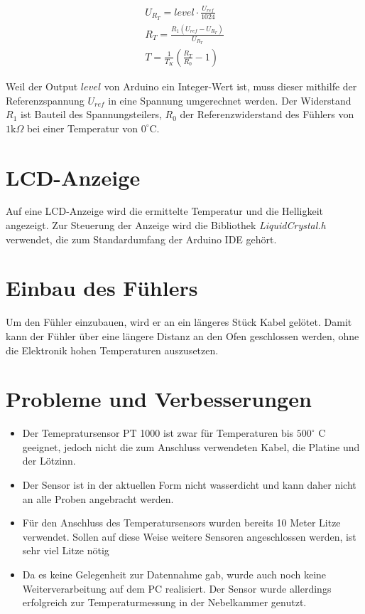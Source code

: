 \begin{gather*}
	U_{R_T} = level \cdot \frac{U_{ref}}{1024} \\
	R_T = \frac{R_1 \left(U_{ref}-U_{R_T}\right)}{U_{R_T}}\\
	T = \frac{1}{T_K} \left(\frac{R_T}{R_0} - 1\right)
\end{gather*}

Weil der Output $level$ von Arduino ein Integer-Wert ist, muss dieser mithilfe der Referenzspannung $U_{ref}$ in eine Spannung umgerechnet werden. Der Widerstand $R_1$ ist Bauteil des Spannungsteilers, $R_0$ der Referenzwiderstand des Fühlers von $1 \text{k}\Omega$ bei einer Temperatur von $0^\circ \text{C}$. 

\section{LCD-Anzeige}
Auf eine LCD-Anzeige wird die ermittelte Temperatur und die Helligkeit angezeigt. Zur Steuerung der Anzeige wird die Bibliothek \textit{LiquidCrystal.h} verwendet, die zum Standardumfang der Arduino IDE gehört.

\section{Einbau des Fühlers}
Um den Fühler einzubauen, wird er an ein längeres Stück Kabel gelötet. Damit kann der Fühler über eine längere Distanz an den Ofen geschlossen werden, ohne die Elektronik hohen Temperaturen auszusetzen.


\section{Probleme und Verbesserungen}
\begin{itemize}
	\item Der Temepratursensor PT 1000 ist zwar für Temperaturen bis $500^{\circ}$ C geeignet, jedoch nicht die zum Anschluss verwendeten Kabel, die Platine und der Lötzinn.
	\item Der Sensor ist in der aktuellen Form nicht wasserdicht und kann daher nicht an alle Proben angebracht werden.
	\item Für den Anschluss des Temperatursensors wurden bereits 10 Meter Litze verwendet. Sollen auf diese Weise weitere Sensoren angeschlossen werden, ist sehr viel Litze nötig
	\item Da es keine Gelegenheit zur Datennahme gab, wurde auch noch keine Weiterverarbeitung auf dem PC realisiert. Der Sensor wurde allerdings erfolgreich zur Temperaturmessung in der Nebelkammer genutzt.
\end{itemize}

\clearpage

